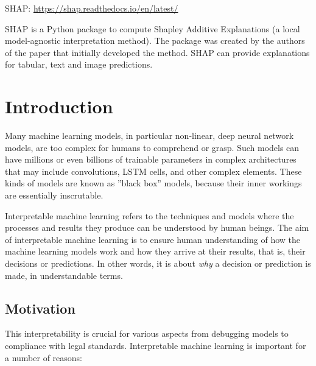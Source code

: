 \begin{resourcebox}
\vspace{\baselineskip}

SHAP: \small\url{https://shap.readthedocs.io/en/latest/}\normalsize

\vspace{\baselineskip}
\end{resourcebox}

SHAP is a Python package to compute Shapley Additive Explanations (a local model-agnostic interpretation method). The package was created by the authors of the paper that initially developed the method. SHAP can provide explanations for tabular, text and image predictions. 



\section{Introduction}

Many machine learning models, in particular non-linear, deep neural network models, are too complex for humans to comprehend or grasp. Such models can have millions or even billions of trainable parameters in complex architectures that may include convolutions, LSTM cells, and other complex elements. These kinds of models are known as ''black box'' models, because their inner workings are essentially inscrutable.

Interpretable machine learning refers to the techniques and models where the processes and results they produce can be understood by human beings. The aim of interpretable machine learning is to ensure human understanding of how the machine learning models work and how they arrive at their results, that is, their decisions or predictions. In other words, it is about \emph{why} a decision or prediction is made, in understandable terms. 

\subsection*{Motivation}

This interpretability is crucial for various aspects from debugging models to compliance with legal standards. Interpretable machine learning is important for a number of reasons:

